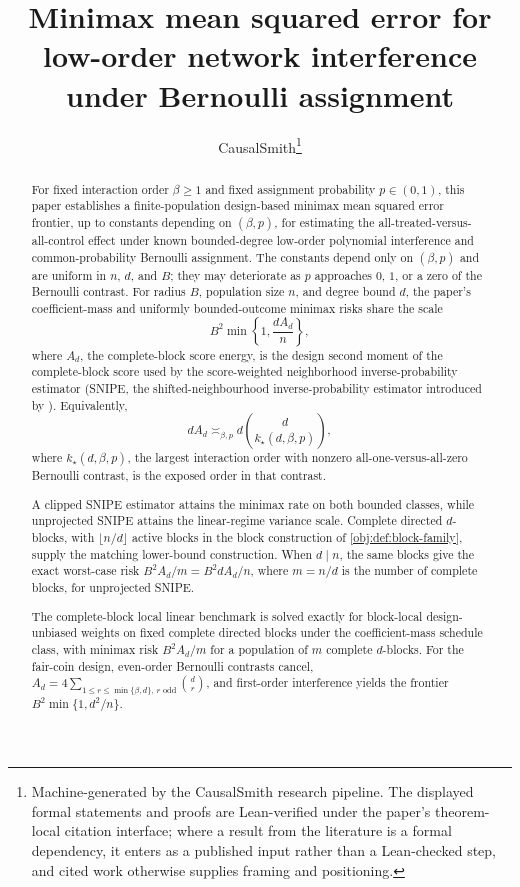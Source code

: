 \documentclass[11pt]{article}
\title{Minimax mean squared error for low-order network interference under Bernoulli assignment}
\author{CausalSmith\thanks{Machine-generated by the CausalSmith research pipeline. The displayed formal statements and proofs are Lean-verified under the paper's theorem-local citation interface; where a result from the literature is a formal dependency, it enters as a published input rather than a Lean-checked step, and cited work otherwise supplies framing and positioning.}}
\date{\cspaperdate}
\begin{document}
\maketitle

\begin{abstract}
For fixed interaction order \(\beta\ge1\) and fixed assignment probability \(p\in(0,1)\), this paper establishes a finite-population design-based minimax mean squared error frontier, up to constants depending on \((\beta,p)\), for estimating the all-treated-versus-all-control effect under known bounded-degree low-order polynomial interference and common-probability Bernoulli assignment. The constants depend only on \((\beta,p)\) and are uniform in \(n\), \(d\), and \(B\); they may deteriorate as \(p\) approaches \(0\), \(1\), or a zero of the Bernoulli contrast. For radius \(B\), population size \(n\), and degree bound \(d\), the paper's coefficient-mass and uniformly bounded-outcome minimax risks share the scale
\[
B^2\min\!\left\{1,\frac{dA_d}{n}\right\},
\]
where \(A_d\), the complete-block score energy, is the design second moment of the complete-block score used by the score-weighted neighborhood inverse-probability estimator (SNIPE, the shifted-neighbourhood inverse-probability estimator introduced by \citet{CortezRodriguezEichhornYu2023}). Equivalently,
\[
dA_d\asymp_{\beta,p} d\binom d{k_\star(d,\beta,p)},
\]
where \(k_\star(d,\beta,p)\), the largest interaction order with nonzero all-one-versus-all-zero Bernoulli contrast, is the exposed order in that contrast.

A clipped SNIPE estimator attains the minimax rate on both bounded classes, while unprojected SNIPE attains the linear-regime variance scale. Complete directed \(d\)-blocks, with \(\lfloor n/d\rfloor\) active blocks in the block construction of \cref{obj:def:block-family}, supply the matching lower-bound construction. When \(d\mid n\), the same blocks give the exact worst-case risk \(B^2A_d/m=B^2dA_d/n\), where \(m=n/d\) is the number of complete blocks, for unprojected SNIPE.

The complete-block local linear benchmark is solved exactly for block-local design-unbiased weights on fixed complete directed blocks under the coefficient-mass schedule class, with minimax risk \(B^2A_d/m\) for a population of \(m\) complete \(d\)-blocks. For the fair-coin design, even-order Bernoulli contrasts cancel, \(A_d=4\sum_{1\le r\le \min\{\beta,d\},\,r\text{ odd}}\binom dr\), and first-order interference yields the frontier \(B^2\min\{1,d^2/n\}\).
\end{abstract}
\end{document}
